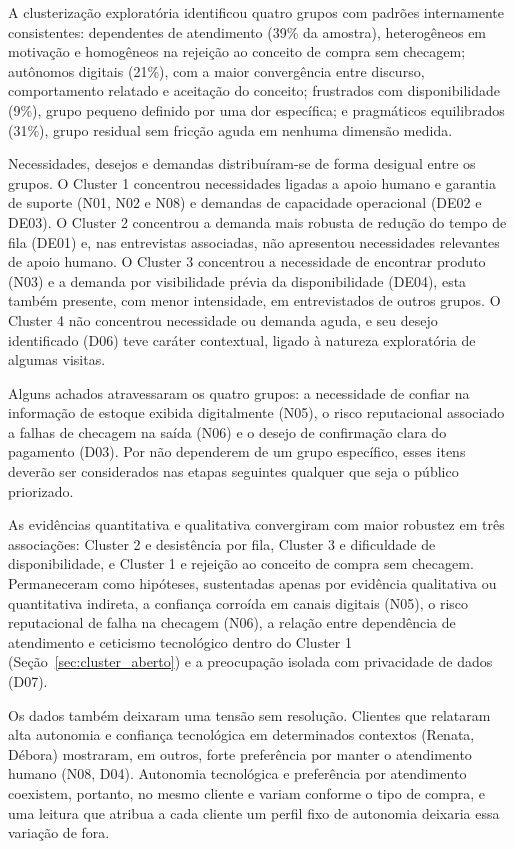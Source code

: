 A clusterização exploratória identificou quatro grupos com padrões internamente consistentes: dependentes de atendimento (39\% da amostra), heterogêneos em motivação e homogêneos na rejeição ao conceito de compra sem checagem; autônomos digitais (21\%), com a maior convergência entre discurso, comportamento relatado e aceitação do conceito; frustrados com disponibilidade (9\%), grupo pequeno definido por uma dor específica; e pragmáticos equilibrados (31\%), grupo residual sem fricção aguda em nenhuma dimensão medida.

Necessidades, desejos e demandas distribuíram-se de forma desigual entre os grupos. O Cluster 1 concentrou necessidades ligadas a apoio humano e garantia de suporte (N01, N02 e N08) e demandas de capacidade operacional (DE02 e DE03). O Cluster 2 concentrou a demanda mais robusta de redução do tempo de fila (DE01) e, nas entrevistas associadas, não apresentou necessidades relevantes de apoio humano. O Cluster 3 concentrou a necessidade de encontrar produto (N03) e a demanda por visibilidade prévia da disponibilidade (DE04), esta também presente, com menor intensidade, em entrevistados de outros grupos. O Cluster 4 não concentrou necessidade ou demanda aguda, e seu desejo identificado (D06) teve caráter contextual, ligado à natureza exploratória de algumas visitas.

Alguns achados atravessaram os quatro grupos: a necessidade de confiar na informação de estoque exibida digitalmente (N05), o risco reputacional associado a falhas de checagem na saída (N06) e o desejo de confirmação clara do pagamento (D03). Por não dependerem de um grupo específico, esses itens deverão ser considerados nas etapas seguintes qualquer que seja o público priorizado.

As evidências quantitativa e qualitativa convergiram com maior robustez em três associações: Cluster 2 e desistência por fila, Cluster 3 e dificuldade de disponibilidade, e Cluster 1 e rejeição ao conceito de compra sem checagem. Permaneceram como hipóteses, sustentadas apenas por evidência qualitativa ou quantitativa indireta, a confiança corroída em canais digitais (N05), o risco reputacional de falha na checagem (N06), a relação entre dependência de atendimento e ceticismo tecnológico dentro do Cluster 1 (Seção~\ref{sec:cluster_aberto}) e a preocupação isolada com privacidade de dados (D07).

Os dados também deixaram uma tensão sem resolução. Clientes que relataram alta autonomia e confiança tecnológica em determinados contextos (Renata, Débora) mostraram, em outros, forte preferência por manter o atendimento humano (N08, D04). Autonomia tecnológica e preferência por atendimento coexistem, portanto, no mesmo cliente e variam conforme o tipo de compra, e uma leitura que atribua a cada cliente um perfil fixo de autonomia deixaria essa variação de fora.

